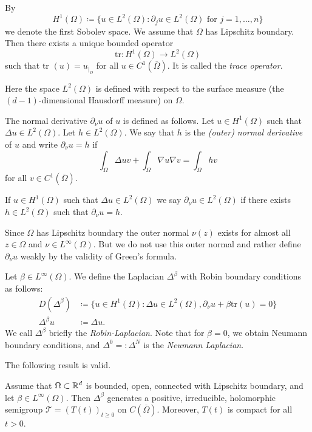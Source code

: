 By %
\[
	H^{1}(\Omega) \coloneq \{u \in L^{2}(\Omega) \colon \partial_j u \in L^{2}(\Omega) 
	\text{ for } j = 1, \ldots, n\}
\]
%
we denote the first Sobolev space.
We assume that $\Omega$ has Lipschitz boundary. 
Then there exists a unique bounded operator 
%
\[
	\text{tr} \colon H^{1}(\Omega) \to L^{2}(\Omega)
\]
%
such that $\text{tr }(u) = u_{|_{\Omega}}$ for all $u \in C^{1}(\overline{\Omega})$. 
It is called the \emph{trace operator}.

Here the space $L^{2}(\Omega)$ is defined with respect to the surface measure (\ie the $(d-1)$-dimensional Hausdorff measure) on $\Omega$.

The normal derivative $\partial_\nu u$ of $u$ is defined as follows. Let $u \in H^{1}(\Omega)$ such that $\Delta u \in L^{2}(\Omega)$. Let $h \in L^{2}(\Omega)$. We say that $h$ is the \emph{(outer) normal derivative} of $u$ and write $\partial_\nu u = h$ if
\[\int_\Omega \Delta u v + \int_\Omega \nabla u \nabla v = \int_{\Omega} h v\]
for all $v \in C^{1}(\overline{\Omega})$.

If $u \in H^{1}(\Omega)$ such that $\Delta u \in L^{2}(\Omega)$ we say $\partial_\nu u \in L^{2}(\Omega)$ if there exists $h \in L^{2}(\Omega)$ such that $\partial_\nu u = h$.
\begin{remark*}
Since $\Omega$ has Lipschitz boundary the outer normal $\nu(z)$ exists for almost all $z \in \Omega$ and $\nu \in L^{\infty}(\Omega)$. 
But we do not use this outer normal and rather define $\partial_\nu u$ weakly by the validity of Green's formula.
\end{remark*}
Let $\beta \in L^{\infty}(\Omega)$. 
We define the Laplacian $\Delta^\beta$ with Robin boundary conditions as follows:
\begin{align*}
	D(\Delta^\beta) &\coloneq \{u \in H^{1}(\Omega) : \Delta u \in L^{2}(\Omega), \partial_\nu u + \beta 				\text{tr}(u) = 0\} \\
	\Delta^\beta u &\coloneq \Delta u.
\end{align*}
We call $\Delta^{\beta}$ briefly the \emph{Robin-Laplacian}. Note that for $\beta = 0$, we obtain Neumann boundary conditions, and $\Delta^{0} =: \Delta^{N}$ is the \emph{Neumann Laplacian}.

The following result is valid.
\begin{theorem}
Assume that $\Omega \subset \mathbb{R}^d$ is bounded, open, connected with Lipschitz boundary, and let $\beta \in L^{\infty}(\Omega)$. 
Then $\Delta^\beta$ generates a positive, irreducible, holomorphic semigroup $\mathcal{T} = (T(t))_{t \geq 0}$ on $C(\overline{\Omega})$. 
Moreover, $T(t)$ is compact for all $t > 0$.
\end{theorem}
